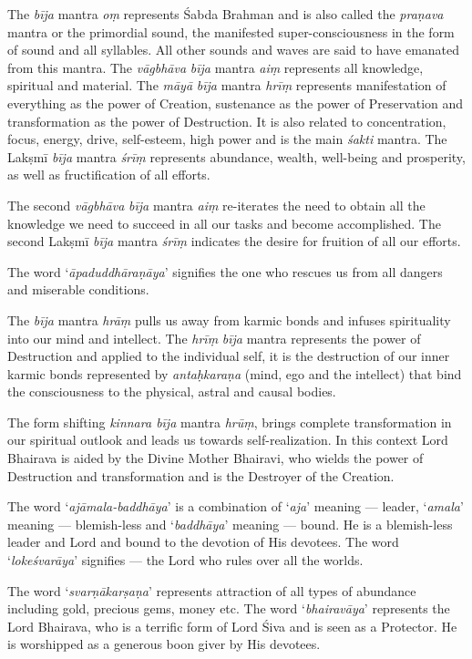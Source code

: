 \documentclass[11pt,oneside,a4paper]{article}
\newcommand{\tl}[1]{\emph{#1}}
\begin{document}
The \tl{bīja} mantra \tl{oṃ} represents Śabda Brahman and is also called
the \tl{praṇava} mantra or the primordial sound, the manifested
super-consciousness in the form of sound and all syllables. All other sounds
and waves are said to have emanated from this mantra. The \tl{vāgbhāva}
\tl{bīja} mantra \tl{aiṃ} represents all knowledge, spiritual and material.
The \tl{māyā} \tl{bīja} mantra \tl{hrīṃ} represents manifestation of everything
as the power of Creation, sustenance as the power of Preservation and
transformation as the power of Destruction. It is also related to concentration,
focus, energy, drive, self-esteem, high power and is the main \tl{śakti} mantra.
The Lakṣmī \tl{bīja} mantra \tl{śrīṃ} represents abundance, wealth, well-being
and prosperity, as well as fructification of all efforts.

The second \tl{vāgbhāva} \tl{bīja} mantra \tl{aiṃ} re-iterates the need to
obtain all the knowledge we need to succeed in all our tasks and become
accomplished. The second Lakṣmī \tl{bīja} mantra \tl{śrīṃ} indicates the desire
for fruition of all our efforts.

The word ‘\tl{āpaduddhāraṇāya}’ signifies the one who rescues us from all
dangers and miserable conditions.

The \tl{bīja} mantra \tl{hrāṃ} pulls us away from karmic bonds and infuses
spirituality into our mind and intellect. The \tl{hrīṃ} \tl{bīja} mantra
represents the power of Destruction and applied to the individual self, it is
the destruction of our inner karmic bonds represented by \tl{antaḥkaraṇa}
(mind, ego and the intellect) that bind the consciousness to the physical,
astral and causal bodies.

The form shifting \tl{kinnara bīja} mantra \tl{hrūṃ}, brings complete
transformation in our spiritual outlook and leads us towards self-realization.
In this context Lord Bhairava is aided by the Divine Mother Bhairavi, who wields
the power of Destruction and transformation and is the Destroyer of
the Creation.

The word ‘\tl{ajāmala-baddhāya}’ is a combination of ‘\tl{aja}’ meaning — leader,
‘\tl{amala}’ meaning — blemish-less and ‘\tl{baddhāya}’ meaning — bound. He is
a blemish-less leader and Lord and bound to the devotion of His devotees.
The word ‘\tl{lokeśvarāya}’ signifies — the Lord who rules over all the worlds.

The word ‘\tl{svarṇākarṣaṇa}’ represents attraction of all types of abundance
including gold, precious gems, money etc. The word ‘\tl{bhairavāya}’ represents
the Lord Bhairava, who is a terrific form of Lord Śiva and is seen as
a Protector. He is worshipped as a generous boon giver by His devotees.
\end{document}
